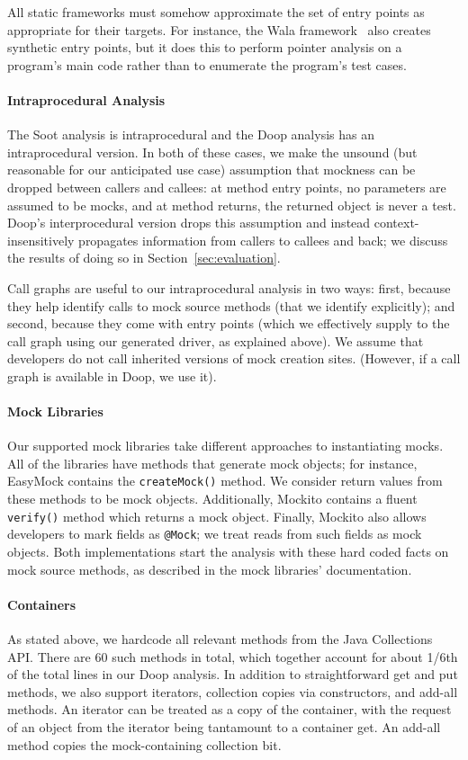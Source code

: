 All static frameworks must somehow approximate the set of entry points as appropriate for their targets. For instance, the Wala framework~\cite{wala19:_t} also creates synthetic entry points, but it does this to perform pointer analysis on a program's main code rather than to enumerate the program's test cases.

\paragraph{Intraprocedural Analysis} The Soot analysis is intraprocedural and the Doop analysis has an intraprocedural version. In both of these cases, we make the unsound (but reasonable for our anticipated use case) assumption that mockness can be dropped between callers and callees: at method entry points, no parameters are assumed to be mocks, and at method returns, the returned object is never a test. Doop's interprocedural version drops this assumption and instead context-insensitively propagates information from callers to callees and back; we discuss the results of doing so in Section~\ref{sec:evaluation}.

Call graphs are useful to our intraprocedural analysis in two ways: first, because they help identify calls to mock source methods (that we identify explicitly); and second, because they come with entry points (which we effectively supply to the call graph using our generated driver, as explained above). We assume that developers do not call inherited versions of mock creation sites. (However, if a call graph is available in Doop, we use it). 

\paragraph{Mock Libraries}
Our supported mock libraries take different approaches to instantiating mocks. All of the libraries have methods that generate mock objects; for instance, EasyMock contains the \texttt{createMock()} method. We consider return values from these methods to be mock objects. Additionally, Mockito contains a fluent \texttt{verify()} method which returns a mock object. Finally, Mockito also allows developers to mark fields as \texttt{@Mock}; we treat reads from such fields as mock objects. Both implementations start the analysis with these hard coded facts on mock source methods, as described in the mock libraries' documentation.

\paragraph{Containers} 
As stated above, we hardcode all relevant methods from the Java Collections API. There are 60 such methods in total, which together account for about 1/6th of the total lines in our Doop analysis. In addition to straightforward get and put methods, we also support iterators, collection copies via constructors, and add-all methods. An iterator can be treated as a copy of the container, with the request of an object from the iterator being tantamount to a container get. An add-all method copies the mock-containing collection bit.
